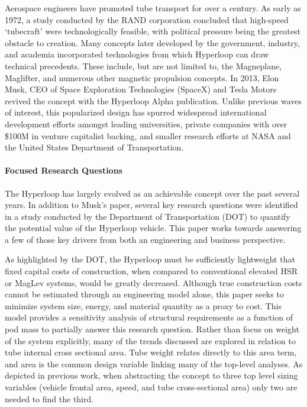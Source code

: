     Aerospace engineers have promoted tube transport for over a century.
    As early as 1972, a study conducted by the RAND corporation concluded that
    high-speed `tubecraft' were technologically feasible, with political pressure being the greatest
    obstacle to creation.\cite{RAND} Many concepts later developed by
    the government, industry, and academia incorporated technologies from which
    Hyperloop can draw technical precedents.
    These include, but are not limited to, the Magneplane, Maglifter, and numerous
    other magnetic propulsion concepts. In 2013, Elon Musk, CEO of Space Exploration
    Technologies (SpaceX) and Tesla Motors revived the concept with the
    Hyperloop Alpha publication.\cite{Musk}
    Unlike previous waves of interest, this popularized design has spurred widespread international
    development efforts amongst leading universities, private companies with over
    \$100M in venture capitalist backing, and smaller research efforts at NASA and the
    United States Department of Transportation. \cite{Chin}

\paragraph{Focused Research Questions}

    The Hyperloop has largely evolved as an achievable concept over the past several years.
    In addition to Musk's paper, several key research questions were identified in a study conducted
    by the Department of Transportation (DOT) to quantify the potential value of the
    Hyperloop vehicle. \cite{Volpe} This paper works towards answering a few of
    those key drivers from both an engineering and business perspective.

    As highlighted by the DOT, the Hyperloop must be sufficiently lightweight
    that fixed capital costs of construction, when compared to conventional
    elevated HSR or MagLev systems, would be greatly decreased.
    Although true construction costs cannot be estimated through an engineering
    model alone, this paper seeks to minimize system size, energy, and material
    quantity as a proxy to cost. This model provides a sensitivity
    analysis of structural requirements as a function of pod mass to partially
    answer this research question. Rather than focus on weight of the system explicitly,
    many of the trends discussed are explored in relation to tube internal
    cross sectional area. Tube weight relates directly to this area term, and
    area is the common design variable linking many of the top-level
    analyses. As depicted in previous work,
    \cite{Chin} when abstracting the concept to three top level
    sizing variables (vehicle frontal area, speed, and tube cross-sectional area)
    only two are needed to find the third.

